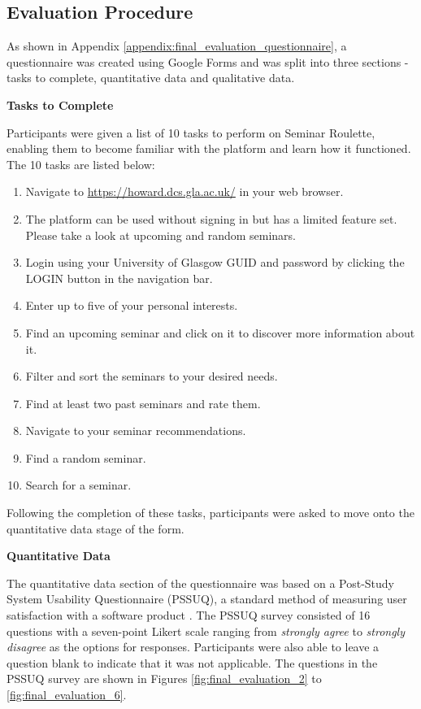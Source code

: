 \documentclass{l4proj}
\begin{document}
\subsection{Evaluation Procedure}
\label{section:evaluation_procedure}

As shown in Appendix \ref{appendix:final_evaluation_questionnaire}, a questionnaire was created using Google Forms and was split into three sections - tasks to complete, quantitative data and qualitative data.

\textbf{Tasks to Complete}

Participants were given a list of 10 tasks to perform on Seminar Roulette, enabling them to become familiar with the platform and learn how it functioned. The 10 tasks are listed below:

\begin{enumerate}
    \item Navigate to \url{https://howard.dcs.gla.ac.uk/} in your web browser.
    \item The platform can be used without signing in but has a limited feature set. Please take a look at upcoming and random seminars.
    \item Login using your University of Glasgow GUID and password by clicking the LOGIN button in the navigation bar.
    \item Enter up to five of your personal interests.
    \item Find an upcoming seminar and click on it to discover more information about it.
    \item Filter and sort the seminars to your desired needs.
    \item Find at least two past seminars and rate them.
    \item Navigate to your seminar recommendations.
    \item Find a random seminar.
    \item Search for a seminar.
\end{enumerate}

Following the completion of these tasks, participants were asked to move onto the quantitative data stage of the form.

\textbf{Quantitative Data}

The quantitative data section of the questionnaire was based on a Post-Study System Usability Questionnaire (PSSUQ), a standard method of measuring user satisfaction with a software product \citep{pssuq}. The PSSUQ survey consisted of 16 questions with a seven-point Likert scale ranging from \emph{strongly agree} to \emph{strongly disagree} as the options for responses. Participants were also able to leave a question blank to indicate that it was not applicable. The questions in the PSSUQ survey are shown in Figures \ref{fig:final_evaluation_2} to \ref{fig:final_evaluation_6}.
\end{document}
